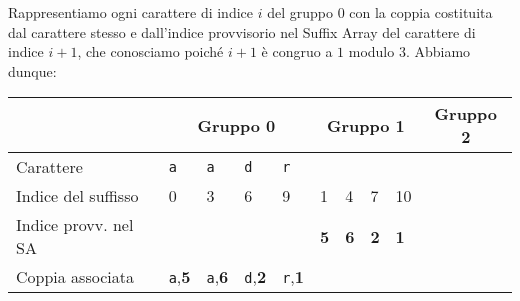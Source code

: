Rappresentiamo ogni carattere di indice \(i\) del gruppo \(0\) con la coppia 
costituita dal carattere stesso e dall'indice provvisorio nel Suffix Array del 
carattere di indice \(i+1\), che conosciamo poich\'e \(i+1\) \`e congruo a \(1\) modulo \(3\).
Abbiamo dunque:
\begin{table}[H]
  \begin{tabularx}{\linewidth}{l*{11}{X}}
                        & \multicolumn{4}{c}{Gruppo 0 \cellcolor{green} } 
                        & \multicolumn{4}{c}{Gruppo 1 \cellcolor{red} } 
                        & \multicolumn{3}{c}{Gruppo 2 \cellcolor{yellow} }\\
    \hline
    Carattere           & \texttt{a} & \texttt{a} & \texttt{d} & \texttt{r}
                        & \multicolumn{4}{c}{\cellcolor{gray!25}}
                        & \multicolumn{3}{c}{\cellcolor{gray!25}} \\
    Indice del suffisso & 0 & 3 & 6 & 9
                        & 1 & 4 & 7 & 10
                        & \multicolumn{3}{c}{\cellcolor{gray!25}} \\
    Indice provv. nel SA & \multicolumn{4}{c}{\cellcolor{gray!25}}
                        & \textbf{5} & \textbf{6} & \textbf{2} & \textbf{1}
                        & \multicolumn{3}{c}{\cellcolor{gray!25}} \\
    Coppia associata    & \texttt{a},\textbf{5} & \texttt{a},\textbf{6}
                        & \texttt{d},\textbf{2} & \texttt{r},\textbf{1}
                        & \multicolumn{4}{c}{\cellcolor{gray!25}}
                        & \multicolumn{3}{c}{\cellcolor{gray!25}} \\

  \end{tabularx}
\end{table}

